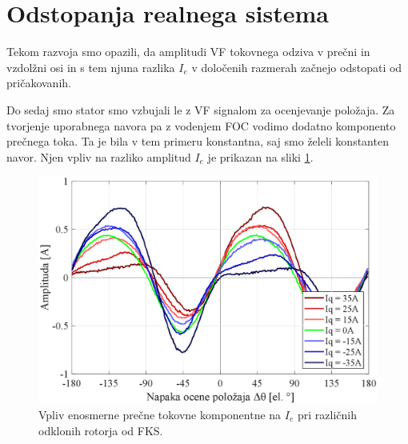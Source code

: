 \documentclass[a4paper,twoside,openright,12pt,slovene]{book}
\begin{document}
\section{Odstopanja realnega sistema}

Tekom razvoja smo opazili, da amplitudi VF tokovnega odziva v prečni in vzdolžni osi in s tem njuna razlika $I_e$ v določenih razmerah začnejo odstopati od pričakovanih. 

Do sedaj smo stator smo vzbujali le z VF signalom za ocenjevanje položaja. Za tvorjenje uporabnega navora pa z vodenjem FOC vodimo dodatno komponento prečnega toka. Ta je bila v tem primeru 
konstantna, saj smo želeli konstanten navor. Njen vpliv na razliko amplitud $I_e$ je prikazan na sliki \ref{reguliranaVelicinaIs}. 

\begin{figure}[!htbp]
    \centering
    \includegraphics[width=0.99\columnwidth]{Slike/reguliranaVelicinaIs.eps}
    \caption{\label{reguliranaVelicinaIs} Vpliv enosmerne prečne tokovne komponentne na $I_e$ pri različnih odklonih rotorja od FKS.}
\end{figure}
\end{document}
